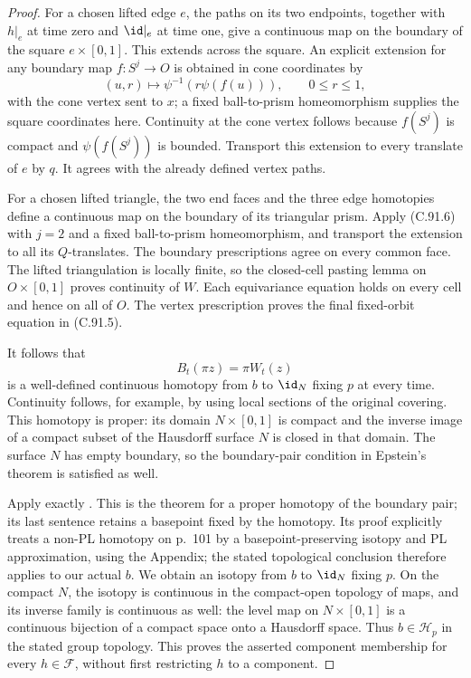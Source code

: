 \begin{proof}
For a chosen lifted edge $e$, the paths on its two endpoints,
together with $h|_e$ at time zero and $\id|_e$ at time one,
give a continuous map on the boundary of the square
$e\times[0,1]$.  This extends across the square.
An explicit extension for any boundary map $f:S^j\to O$
is obtained in cone coordinates by
\[
       (u,r)\longmapsto\psi^{-1}(r\psi(f(u))),
       \qquad 0\leq r\leq1,                                  \tag{C.91.6}
\]
with the cone vertex sent to $x$; a fixed ball-to-prism
homeomorphism supplies the square coordinates here.
Continuity at the cone vertex follows because $f(S^j)$
is compact and $\psi(f(S^j))$ is bounded.
Transport this extension to every translate of $e$ by $q$.
It agrees with the already defined vertex paths.

For a chosen lifted triangle, the two end faces and the
three edge homotopies define a continuous map on the
boundary of its triangular prism.  Apply (C.91.6) with
$j=2$ and a fixed ball-to-prism homeomorphism, and transport
the extension to all its $Q$-translates.
The boundary prescriptions agree on every common face.
The lifted triangulation is locally finite, so the closed-cell
pasting lemma on $O\times[0,1]$ proves continuity of $W$.
Each equivariance equation holds on every cell and hence
on all of $O$.  The vertex prescription proves the final
fixed-orbit equation in (C.91.5).

It follows that
\[
             B_t(\pi z)=\pi W_t(z)                            \tag{C.91.7}
\]
is a well-defined continuous homotopy from $b$ to $\id_N$
fixing $p$ at every time.  Continuity follows, for example,
by using local sections of the original covering.
This homotopy is proper: its domain $N\times[0,1]$ is
compact and the inverse image of a compact subset of
the Hausdorff surface $N$ is closed in that domain.
The surface $N$ has empty boundary, so the boundary-pair
condition in Epstein's theorem is satisfied as well.

Apply exactly \cite[Theorem~6.3, p.~99; proof, pp.~100--101]
{C_Epstein1966}.  This is the theorem for a proper homotopy
of the boundary pair; its last sentence retains a basepoint
fixed by the homotopy.  Its proof explicitly treats a
non-PL homotopy on p.~101 by a basepoint-preserving isotopy
and PL approximation, using the Appendix; the stated
topological conclusion therefore applies to our actual $b$.
We obtain an isotopy from $b$ to $\id_N$ fixing $p$.
On the compact $N$, the isotopy is continuous in the
compact-open topology of maps, and its inverse family is
continuous as well: the level map on $N\times[0,1]$ is
a continuous bijection of a compact space onto a Hausdorff
space.  Thus $b\in\mathscr H_p$ in the stated group topology.
This proves the asserted component membership for every
$h\in\mathscr F$, without first restricting $h$ to a component.


\end{proof}
